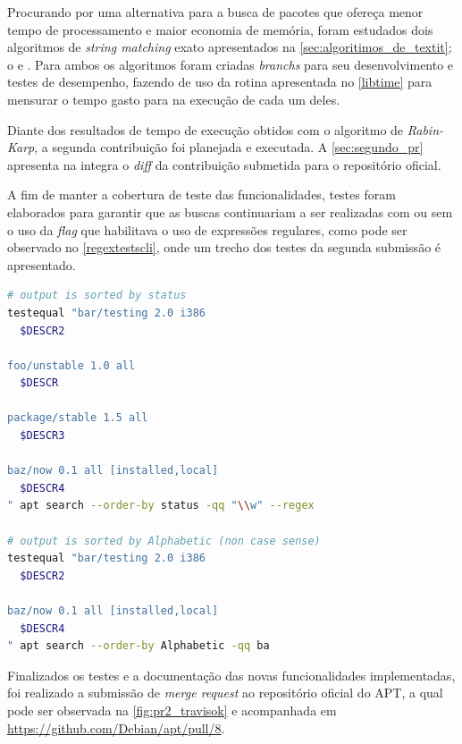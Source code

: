 

Procurando por uma alternativa para a busca de pacotes que ofereça menor tempo de processamento e maior economia de memória, foram estudados dois algoritmos de \textit{string matching} exato apresentados na \autoref{sec:algoritimos_de_textit}; o  e . Para ambos os algoritmos foram criadas \textit{branchs} para seu desenvolvimento e testes de desempenho, fazendo de uso da rotina apresentada no \autoref{libtime} para mensurar o tempo gasto para na execução de cada um deles.

Diante dos resultados de tempo de execução obtidos com o algoritmo de \textit{Rabin-Karp}, a segunda contribuição foi planejada e executada. A \autoref{sec:segundo_pr} apresenta na integra o \textit{diff} da contribuição submetida para o repositório oficial.


A fim de manter a cobertura de teste das funcionalidades, testes foram elaborados para garantir que as buscas continuariam a ser realizadas com ou sem o uso da \textit{flag} que habilitava o uso de expressões regulares, como pode ser observado no \autoref{regextestscli}, onde um trecho dos testes da segunda submissão é apresentado.

\begin{lstlisting}[language=Bash,label=regextestscli,caption={Teste com e sem o uso de expressões regulares}]
# output is sorted by status
testequal "bar/testing 2.0 i386
  $DESCR2

foo/unstable 1.0 all
  $DESCR

package/stable 1.5 all
  $DESCR3

baz/now 0.1 all [installed,local]
  $DESCR4
" apt search --order-by status -qq "\\w" --regex

# output is sorted by Alphabetic (non case sense)
testequal "bar/testing 2.0 i386
  $DESCR2

baz/now 0.1 all [installed,local]
  $DESCR4
" apt search --order-by Alphabetic -qq ba
\end{lstlisting}

Finalizados os testes e a documentação das novas funcionalidades implementadas, foi realizado a submissão de \textit{merge request} ao repositório oficial do APT, a qual pode ser observada na \autoref{fig:pr2_travisok} e acompanhada em \url{https://github.com/Debian/apt/pull/8}.

